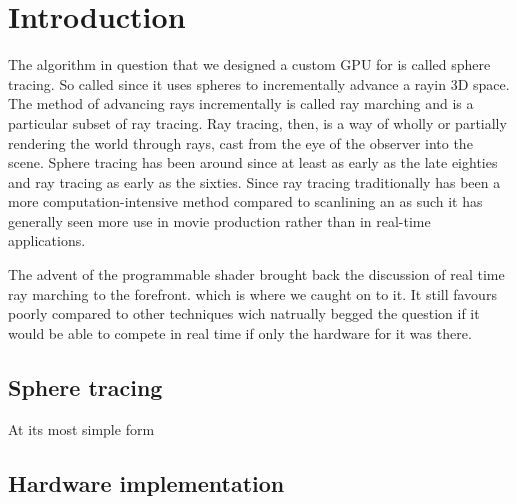 \chapter{Introduction} 

The algorithm in question that we designed a custom GPU for is called sphere
tracing.\cite{Hart1996} So called since it uses spheres to incrementally
advance a ray\footnotemark in 3D space. The method of advancing rays
incrementally is called ray marching and is a particular subset of ray
tracing.\cite{Whitted1980} Ray tracing, then, is a way of wholly or partially
rendering the world through rays, cast from the eye of the observer into the
scene.  Sphere tracing has been around since at least as early as the late
eighties and ray tracing as early as the sixties.\cite{Hart1989,Appel1968}
Since ray tracing traditionally has been a more computation-intensive method
compared to scanlining\cite{Wylie1967} an as such it has generally seen more
use in movie production rather than in real-time applications.\cite{ref_needed?} 


The advent of the programmable shader brought back the discussion of real time
ray marching to the forefront. which is where we caught on to it.
\cite{JamieWong2016} It still favours poorly compared to other techniques wich
natrually begged the question if it would be able to compete in real time if
only the hardware for it was there.


\section{Sphere tracing}

At its most simple form 

\section{Hardware implementation}
